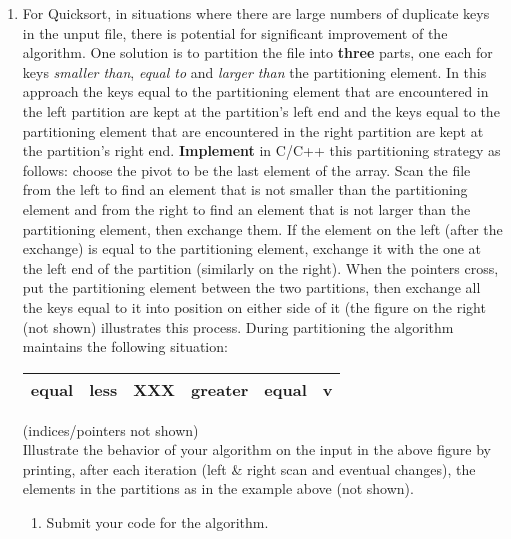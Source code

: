 \documentclass[11pts]{article}
\begin{document}
\begin{enumerate}
\newpage
\item For Quicksort, in situations where there are large numbers of
duplicate keys in the unput file, there is potential for significant
improvement of the algorithm. One solution is to partition the file into
\textbf{three} parts, one each for keys \textit{smaller than},
\textit{equal to} and \textit{larger than} the partitioning element. In
this approach the keys equal to the partitioning element that are
encountered in the left partition are kept at the partition's left end and
the keys equal to the partitioning element that are encountered in the
right partition are kept at the partition's right end. \textbf{Implement}
in C/C++ this partitioning strategy as follows: choose the pivot to be the
last element of the array. Scan the file from the left to find an element
that is not smaller than the partitioning element and from the right to
find an element that is not larger than the partitioning element, then
exchange them. If the element on the left (after the exchange) is equal
to the partitioning element, exchange it with the one at the left end of
the partition (similarly on the right). When the pointers cross, put the
partitioning element between the two partitions, then exchange all the
keys equal to it into position on either side of it (the figure on the
right (not shown) illustrates this process. During partitioning the
algorithm maintains the following situation:
\begin{center}
\begin{tabular}{|c|c|c|c|c|c|}
  \hline
  equal & less & XXX & greater & equal & v \\
  \hline
\end{tabular}
\end{center}
(indices/pointers not shown)\\
Illustrate the behavior of your algorithm on the input in the above
figure by printing, after each iteration (left \& right scan and
eventual changes), the elements in the partitions as in the example
above (not shown).\\

  \begin{enumerate}
  \item Submit your code for the algorithm. \\


\end{enumerate}
\end{enumerate}
\end{document}
